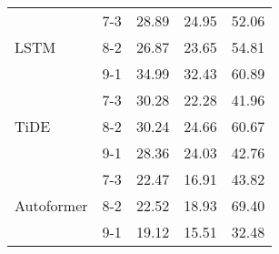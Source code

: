 \begin{table}[h!]
\begin{tabular}{|l|c|c|c|c|}
    \rowcolor{white}  & 7-3 & 28.89 & 24.95 & 52.06 \\ 
    \rowcolor{white} LSTM & 8-2 & 26.87 & 23.65 & 54.81 \\ 
    \rowcolor{white}  & 9-1 & 34.99 & 32.43 & 60.89 \\ \hline
    \rowcolor{white} & 7-3 & 30.28 & 22.28 & 41.96 \\ 
    \rowcolor{white} TiDE & 8-2 & 30.24 & 24.66 & 60.67 \\ 
    \rowcolor{white} & 9-1 & 28.36 & 24.03 & 42.76 \\ \hline
    \rowcolor{white}  & 7-3 & 22.47 & 16.91 & 43.82 \\ 
    \rowcolor{white} Autoformer & 8-2 & 22.52 & 18.93 & 69.40 \\ 
    \rowcolor{white}  & 9-1 & 19.12 & 15.51 & 32.48 \\ \hline

    \end{tabular}
\end{table}